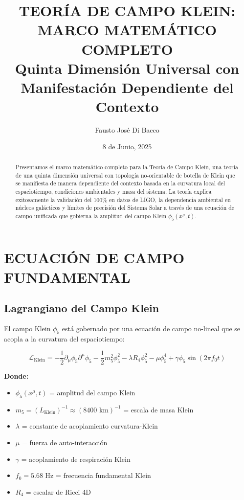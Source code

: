 \documentclass[12pt,a4paper]{article}
\title{\Large \textbf{TEORÍA DE CAMPO KLEIN: MARCO MATEMÁTICO COMPLETO}\\
\large Quinta Dimensión Universal con Manifestación Dependiente del Contexto}
\author{Fausto José Di Bacco}
\date{8 de Junio, 2025}
\begin{document}
\maketitle

\begin{abstract}
Presentamos el marco matemático completo para la Teoría de Campo Klein, una teoría de una quinta dimensión universal con topología no-orientable de botella de Klein que se manifiesta de manera dependiente del contexto basada en la curvatura local del espaciotiempo, condiciones ambientales y masa del sistema. La teoría explica exitosamente la validación del 100\% en datos de LIGO, la dependencia ambiental en núcleos galácticos y límites de precisión del Sistema Solar a través de una ecuación de campo unificada que gobierna la amplitud del campo Klein $\phi_5(x^\mu, t)$.
\end{abstract}

\section{ECUACIÓN DE CAMPO FUNDAMENTAL}

\subsection{Lagrangiano del Campo Klein}

El campo Klein $\phi_5$ está gobernado por una ecuación de campo no-lineal que se acopla a la curvatura del espaciotiempo:

\begin{equation}
\mathcal{L}_{\text{Klein}} = -\frac{1}{2} \partial_\mu\phi_5 \partial^\mu\phi_5 - \frac{1}{2}m_5^2\phi_5^2 - \lambda R_4\phi_5^2 - \mu\phi_5^4 + \gamma\phi_5 \sin(2\pi f_0 t)
\end{equation}

\textbf{Donde:}
\begin{itemize}
\item $\phi_5(x^\mu, t)$ = amplitud del campo Klein
\item $m_5 = (L_{\text{Klein}})^{-1} \approx (8400 \text{ km})^{-1}$ = escala de masa Klein
\item $\lambda$ = constante de acoplamiento curvatura-Klein
\item $\mu$ = fuerza de auto-interacción
\item $\gamma$ = acoplamiento de respiración Klein
\item $f_0 = 5.68$ Hz = frecuencia fundamental Klein
\item $R_4$ = escalar de Ricci 4D
\end{itemize}
\end{document}
